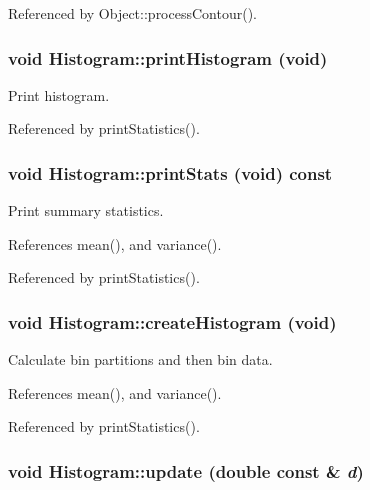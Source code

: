 Referenced by Object::processContour().\hypertarget{classHistogram_e0d8f995fb46dcfd7bbf39bd5aa0674d}{
\subsubsection[printHistogram]{\setlength{\rightskip}{0pt plus 5cm}void Histogram::printHistogram (void)}}
\label{classHistogram_e0d8f995fb46dcfd7bbf39bd5aa0674d}


Print histogram. 

Referenced by printStatistics().\hypertarget{classHistogram_53093234bfd4877f2485e093dbbe65e5}{
\subsubsection[printStats]{\setlength{\rightskip}{0pt plus 5cm}void Histogram::printStats (void) const}}
\label{classHistogram_53093234bfd4877f2485e093dbbe65e5}


Print summary statistics. 

References mean(), and variance().

Referenced by printStatistics().\hypertarget{classHistogram_022e55f20128c0dc5c8108d6d10054e9}{
\subsubsection[createHistogram]{\setlength{\rightskip}{0pt plus 5cm}void Histogram::createHistogram (void)}}
\label{classHistogram_022e55f20128c0dc5c8108d6d10054e9}


Calculate bin partitions and then bin data. 

References mean(), and variance().

Referenced by printStatistics().\hypertarget{classHistogram_56a9572fc514f021a4867887e8fff9de}{
\subsubsection[update]{\setlength{\rightskip}{0pt plus 5cm}void Histogram::update (double const \& {\em d})}}
\label{classHistogram_56a9572fc514f021a4867887e8fff9de}


